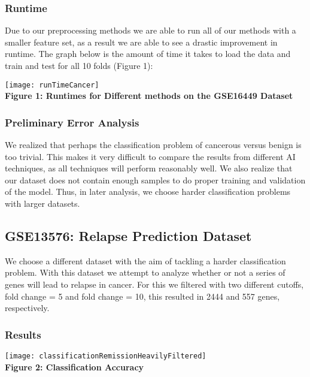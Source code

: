 \documentclass[12pt]{scrartcl}
\begin{document}
    
    
    
    \subsubsection{Runtime}
    Due to our preprocessing methods we are able to run all of our methods with a smaller feature set, as a result we are able to see a drastic improvement in runtime. The graph below is the amount of time it takes to load the data and train and test for all 10 folds (Figure 1):
    
    \begin{center}
    \texttt{[image: runTimeCancer]}\\
    \textbf{Figure 1: Runtimes for Different methods on the GSE16449 Dataset}
    \end{center}
    
    \subsubsection{Preliminary Error Analysis}
    We realized that perhaps the classification problem of cancerous versus benign is too trivial. This makes it very difficult to compare the results from different AI techniques, as all techniques will perform reasonably well. We also realize that our dataset does not contain enough samples to do proper training and validation of the model. Thus, in later analysis, we choose harder classification problems with larger datasets.
    
    \subsection{GSE13576: Relapse Prediction Dataset}
    We choose a different dataset with the aim of tackling a harder classification problem. With this dataset we attempt to analyze whether or not a series of genes will lead to relapse in cancer. For this we filtered with two different cutoffs, fold change = 5 and fold change = 10, this resulted in 2444 and 557 genes, respectively. 
    
    \subsubsection{Results}    
    \begin{center}
    \texttt{[image: classificationRemissionHeavilyFiltered]}\\
    \textbf{Figure 2: Classification Accuracy}
    \end{center}
   
\end{document}
